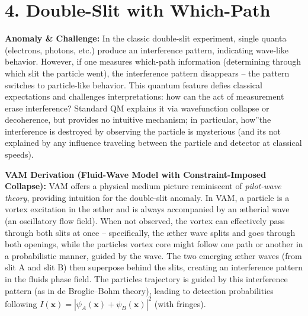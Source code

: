 \documentclass[a4paper, aps,preprint,superscriptaddress, 12pt]{revtex4}
\begin{document}
\section*{4. Double-Slit with Which-Path}

\textbf{Anomaly \& Challenge: } In the classic double-slit experiment, single quanta (electrons, photons, etc.) produce an interference pattern, indicating wave-like behavior. However, if one measures which-path information (determining through which slit the particle went), the interference pattern disappears – the pattern switches to particle-like behavior. This quantum feature defies classical expectations and challenges interpretations: how can the act of measurement erase interference? Standard QM explains it via wavefunction collapse or decoherence, but provides no intuitive mechanism; in particular, \grqq how\textquotedblright the interference is destroyed by observing the particle is mysterious (and it\rqs s not explained by any influence traveling between the particle and detector at classical speeds).


\textbf{VAM Derivation (Fluid-Wave Model with Constraint-Imposed Collapse):} VAM offers a physical medium picture reminiscent of \textit{pilot-wave theory}, providing intuition for the double-slit anomaly. In VAM, a particle is a vortex excitation in the æther and is always accompanied by an ætherial wave (an oscillatory flow field). When not observed, the vortex can effectively pass through both slits at once – specifically, the æther wave splits and goes through both openings, while the particle\rqs s vortex core might follow one path or another in a probabilistic manner, guided by the wave. The two emerging æther waves (from slit A and slit B) then superpose behind the slits, creating an interference pattern in the fluid\rqs s phase field. The particle\rqs s trajectory is guided by this interference pattern (as in de Broglie–Bohm theory), leading to detection probabilities following $I(\mathbf{x}) = |\psi_A(\mathbf{x}) + \psi_B(\mathbf{x})|^2$ (with fringes).
\end{document}
